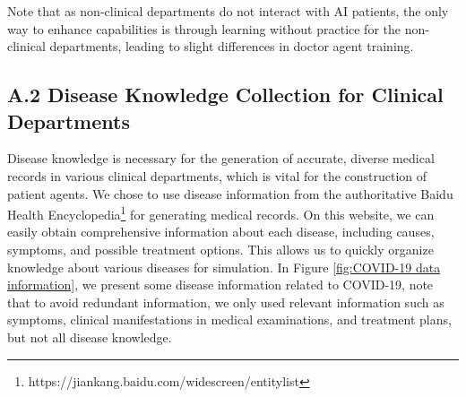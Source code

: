 \documentclass[fleqn,12pt]{wlscirep}
\begin{document}
\begin{table}[H]
\caption{11 non-clinical medical departments in \textit{Agent Hospital}.} \label{table:non_clinical_departments}
\end{table}

Note that as non-clinical departments do not interact with AI patients, the only way to enhance capabilities is through learning without practice for the non-clinical departments, leading to slight differences in doctor agent training. 

\subsection*{A.2 Disease Knowledge Collection for Clinical Departments}

Disease knowledge is necessary for the generation of accurate, diverse medical records in various clinical departments, which is vital for the construction of patient agents. We chose to use disease information from the authoritative Baidu Health Encyclopedia\footnote{https://jiankang.baidu.com/widescreen/entitylist} for generating medical records. On this website, we can easily obtain comprehensive information about each disease, including causes, symptoms, and possible treatment options. This allows us to quickly organize knowledge about various diseases for simulation. In Figure \ref{fig:COVID-19 data information}, we present some disease information related to COVID-19, note that to avoid redundant information, we only used relevant information such as symptoms, clinical manifestations in medical examinations, and treatment plans, but not all disease knowledge.
\end{document}
